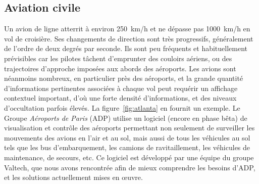	\subsection{Aviation civile}
	Un avion de ligne atterrit à environ 250~km/h et ne dépasse pas 1000~km/h en vol de croisière. Ses changements de direction sont très progressifs, généralement de l'ordre de deux degrés par seconde. Ils sont peu fréquents et habituellement prévisibles car les pilotes tâchent d'emprunter des couloirs aériens, ou des trajectoires d'approche imposées aux abords des aéroports. Les avions sont néanmoins nombreux, en particulier près des aéroports, et la grande quantité d'informations pertinentes associées à chaque vol peut requérir un affichage contextuel important, d'où une forte densité d'informations, et des niveaux d'occultation parfois élevés. La figure~\ref{fig:atlanta} en fournit un exemple. Le Groupe \emph{Aéroports de Paris} (ADP) utilise un logiciel (encore en phase bêta) de visualisation et contrôle des aéroports permettant non seulement de surveiller les mouvements des avions en l'air et au sol, mais aussi de tous les véhicules au sol tels que les bus d'embarquement, les camions de ravitaillement, les véhicules de maintenance, de secours, etc. Ce logiciel est développé par une équipe du groupe Valtech,\footnotemark{} que nous avons rencontrée afin de mieux comprendre les besoins d'ADP, et les solutions actuellement mises en \oe{}uvre.
	
	
